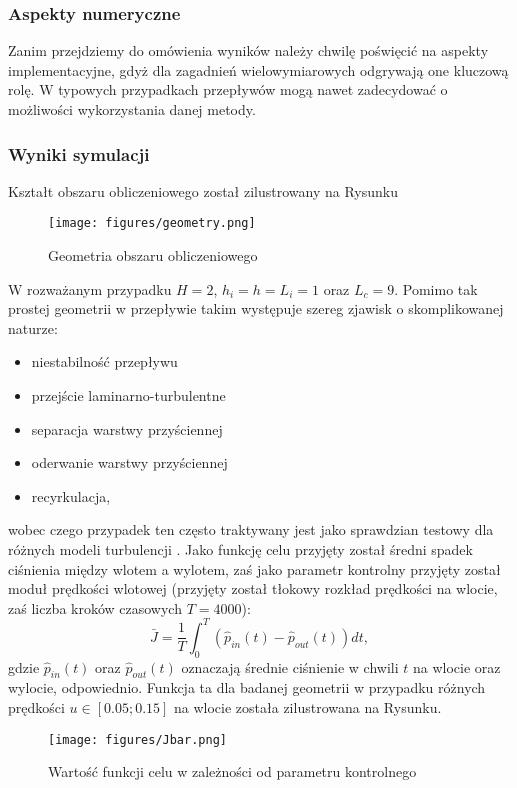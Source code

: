 \documentclass[12pt]{article}
\begin{document}
\subsubsection{Aspekty numeryczne}
Zanim przejdziemy do omówienia wyników należy chwilę poświęcić na aspekty implementacyjne, gdyż dla zagadnień wielowymiarowych odgrywają one kluczową rolę. W typowych przypadkach przepływów mogą nawet zadecydować o możliwości wykorzystania danej metody.
\subsubsection{Wyniki symulacji}
Kształt obszaru obliczeniowego został zilustrowany na Rysunku
\begin{figure}[H]
	\texttt{[image: figures/geometry.png]} 
	\centering
	\caption{Geometria obszaru obliczeniowego}
\end{figure}
W rozważanym przypadku $ H = 2 $, $ h_{i}=h=L_{i}=1 $ oraz $ L_{c}=9 $.\newline
Pomimo tak prostej geometrii w przepływie takim występuje szereg zjawisk o skomplikowanej naturze:
\begin{itemize}
	\item niestabilność przepływu
	\item przejście laminarno-turbulentne
	\item separacja warstwy przyściennej
	\item oderwanie warstwy przyściennej
	\item recyrkulacja,
\end{itemize}
wobec czego przypadek ten często traktywany jest jako sprawdzian testowy dla różnych modeli turbulencji \cite{Salazar}. \newline
Jako funkcję celu przyjęty został średni spadek ciśnienia między wlotem a wylotem, zaś jako parametr kontrolny przyjęty został moduł prędkości wlotowej (przyjęty został tłokowy rozkład prędkości na wlocie, zaś liczba kroków czasowych $ T = 4000 $):
\begin{equation}
\bar{J} = \frac{1}{T}\int_{0}^{T}(\hat{p}_{in}(t)-\hat{p}_{out}(t))dt,
\end{equation}
gdzie $ \hat{p}_{in}(t) $ oraz $ \hat{p}_{out}(t) $ oznaczają średnie ciśnienie w chwili $ t $ na wlocie oraz wylocie, odpowiednio. Funkcja ta dla badanej geometrii w przypadku różnych prędkości $ u \in [0.05 ; 0.15]$ na wlocie została zilustrowana na Rysunku.
\begin{figure}[H]
	\texttt{[image: figures/Jbar.png]} 
	\centering
	\caption{Wartość funkcji celu w zależności od parametru kontrolnego}
\end{figure}
\end{document}

